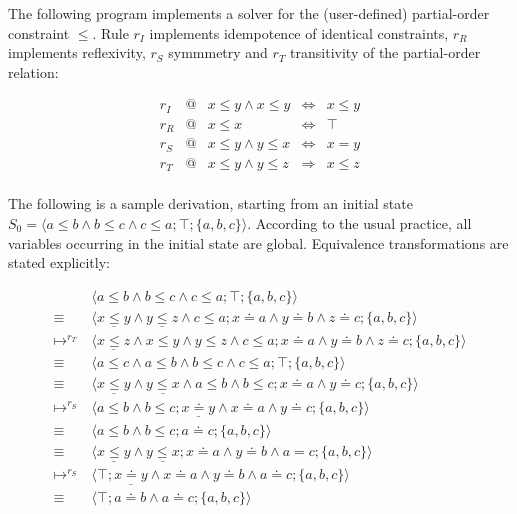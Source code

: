 \documentclass[acmtocl]{acmtrans2m}
\newcommand\state[1]{\langle #1 \rangle}
\begin{document}
\begin{example}
\label{example:leq}

The following program implements a solver for the (user-defined) partial-order
constraint $\leq$. Rule $r_I$ implements idempotence of identical constraints,
$r_R$ implements reflexivity, $r_S$ symmmetry and $r_T$ transitivity of the
partial-order relation:

\medskip
\[
\begin{array}{lclcl}
r_I & @ & x\leq y \wedge x\leq y & \Leftrightarrow & x\leq y \\
r_R & @ & x\leq x & \Leftrightarrow & \top \\
r_S & @ & x\leq y \wedge y\leq x & \Leftrightarrow & x=y \\
r_T & @ & x\leq y \wedge y\leq z & \Rightarrow & x\leq z \\
\end{array}
\]

\medskip
The following is a sample derivation, starting from an initial state
$S_0=\state{a\leq b \wedge b\leq c \wedge c\leq a;\top;\{a,b,c\} }$. According
to the usual practice, all variables occurring in the initial state are global.
Equivalence transformations are stated explicitly:

\setcounter{equation}{0}
\begin{align}
& \state{a\leq b \wedge  b\leq c \wedge c\leq a; \top;\{a,b,c\}}
\label{eq:leq_1}\\
\equiv\: & \state{ \underline{x\leq y} \wedge \underline{y\leq z} \wedge c\leq
a; x\doteq a \wedge y\doteq b \wedge z\doteq c;\{a,b,c\}} \nonumber \\
\mapsto^{r_T}\: & \state{\underline{x\leq z} \wedge x\leq y \wedge y\leq z \wedge c\leq a;
x\doteq a \wedge y\doteq b \wedge z\doteq c;\{a,b,c\}}\nonumber \\
\equiv\: & \state{a\leq c \wedge a\leq b \wedge b\leq c \wedge c\leq a;\top;\{a,b,c\}}
\label{eq:leq_2} \\
\equiv\: & \state{\underline{x\leq y} \wedge \underline{y\leq x} \wedge a\leq b \wedge b\leq
c;x\doteq a \wedge y\doteq c;\{a,b,c\}}\nonumber \\
\mapsto^{r_S}\: & \state{a\leq b \wedge b\leq
c;\underline{x\doteq y} \wedge x\doteq a \wedge y\doteq c;\{a,b,c\}}\nonumber \\
\equiv\: & \state{a\leq b \wedge b\leq c;a\doteq c;\{a,b,c\}} \label{eq:leq_3} \\
\equiv\: & \state{\underline{x\leq y} \wedge \underline{y\leq
x};x\doteq a \wedge y\doteq b \wedge a=c;\{a,b,c\}}\nonumber \\
\mapsto^{r_S}\: & \state{\top;\underline{x\doteq y} \wedge x\doteq a \wedge y\doteq b \wedge a\doteq c;\{a,b,c\}}\nonumber \\
\equiv\: & \state{\top;a\doteq b \wedge  a\doteq c;\{a,b,c\}} \label{eq:leq_4}
\end{align}


\end{example}
\end{document}
